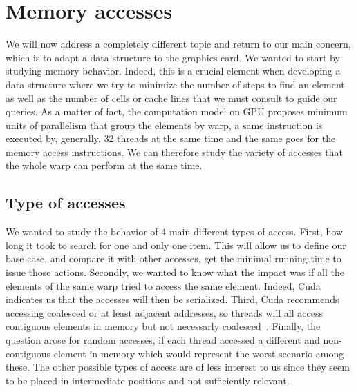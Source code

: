
\chapter{Memory accesses}\label{Accesses}

We will now address a completely different topic and return to our main concern, which is to adapt a data structure to the graphics card. We wanted to start by studying memory behavior. Indeed, this is a crucial element when developing a data structure where we try to minimize the number of steps to find an element as well as the number of cells or cache lines that we must consult to guide our queries. As a matter of fact, the computation model on GPU proposes minimum units of parallelism that group the elements by warp, a same instruction is executed by, generally, 32 threads at the same time and the same goes for the memory access instructions. We can therefore study the variety of accesses that the whole warp can perform at the same time.

\section{Type of accesses}

We wanted to study the behavior of 4 main different types of access. First, how long it took to search for one and only one item. This will allow us to define our base case, and compare it with other accesses, get the minimal running time to issue those actions. Secondly, we wanted to know what the impact was if all the elements of the same warp tried to access the same element. Indeed, Cuda indicates us that the accesses will then be serialized. Third, Cuda recommends accessing coalesced or at least adjacent addresses, so threads will all access contiguous elements in memory but not necessarly coalesced~\cite{harris2007optimizing}. Finally, the question arose for random accesses, if each thread accessed a different and non-contiguous element in memory which would represent the worst scenario among these. The other possible types of access are of less interest to us since they seem to be placed in intermediate positions and not sufficiently relevant.

